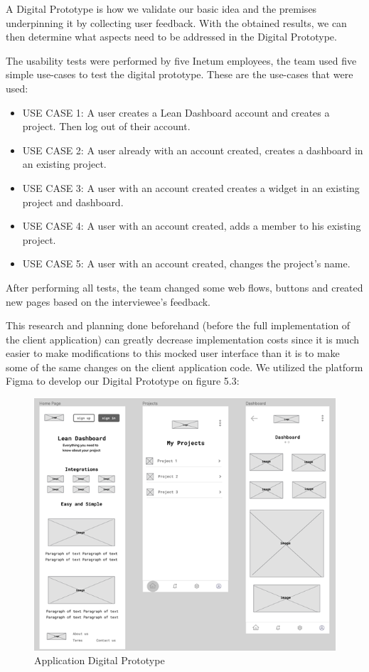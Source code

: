 \documentclass[a4paper,twoside,10pt]{report}
\begin{document}
A Digital Prototype is how we validate our basic idea and the premises underpinning it by collecting user feedback.
With the obtained results, we can then determine what aspects need to be addressed in the Digital Prototype.

The usability tests were performed by five Inetum employees, the team used five simple use-cases to test the digital prototype. These are the use-cases that were used: 
 \begin{itemize}
	\item USE CASE 1: A user creates a Lean Dashboard account and creates a project. Then log out of their account.
	\item USE CASE 2: A user already with an account created, creates a dashboard in an existing project.
	\item USE CASE 3: A user with an account created creates a widget in an existing project and dashboard.
	\item USE CASE 4: A user with an account created, adds a member to his existing project.
	\item USE CASE 5: A user with an account created, changes the project's name.
\end{itemize}	

After performing all tests, the team changed some web flows, buttons and created new pages based on the interviewee's feedback. 

This research and planning done beforehand (before the full implementation of the client application) can greatly decrease implementation costs since it is much easier to make modifications to this mocked user interface than it is to make some of the same changes on the client application code.
We utilized the platform Figma\cite{FIGMA} to develop our Digital Prototype on figure 5.3:
 
\begin{figure}[h!]
\center
  \includegraphics[width=\textwidth]{digital-prototype.png}
\caption{Application Digital Prototype}
\end{figure}
\end{document}

